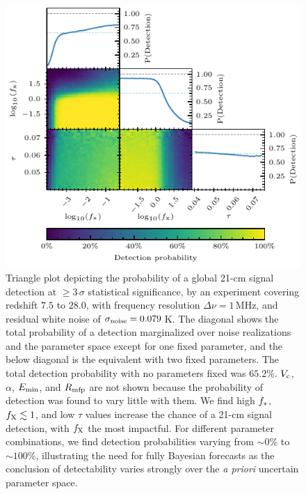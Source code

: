 \documentclass[twocolumn,english,aps,prl,amsmath,amssymb,reprint,footinbib,floatfix,showkeys]{revtex4-2}
\begin{document}
\begin{figure}
\includegraphics{detectability_triangle_3_sigma_noise_0.0790_K.pdf}
    \caption{Triangle plot depicting the probability of a global 21-cm signal detection at $\geq 3$\,$\sigma$ statistical significance, by an experiment covering redshift $7.5$ to $28.0$, with frequency resolution $\Delta \nu = 1$\,MHz, and residual white noise of \mbox{$\sigma_{\rm noise} = 0.079$\,K}.
The diagonal shows the total probability of a detection marginalized over noise realizations and the parameter space except for one fixed parameter, and the below diagonal is the equivalent with two fixed parameters. 
The total detection probability with no parameters fixed was $65.2$\%.
$V_{\rm c}$, $\alpha$, $E_{\rm min}$, and $R_{\rm mfp}$ are not shown because the probability of detection was found to vary little with them. 
We find high $f_{\rm *}$, $f_{\rm X} \lesssim 1$, and low $\tau$ values increase the chance of a 21-cm signal detection, with $f_{\rm X}$ the most impactful.  
For different parameter combinations, we find detection probabilities varying from $\sim 0$\% to $\sim 100$\%, illustrating the need for fully Bayesian forecasts as the conclusion of detectability varies strongly over the \textit{a priori} uncertain parameter space. }
\label{fig:headline_plot}
\end{figure}
\end{document}
